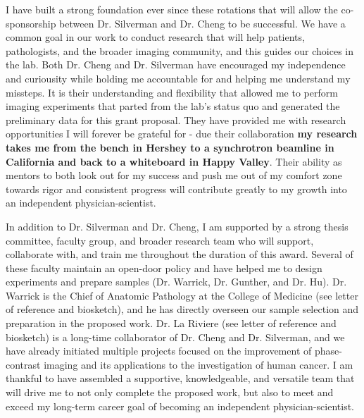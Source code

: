 \documentclass{NIHGrant}
\begin{document}
I have built a strong foundation ever since these rotations that will allow the co-sponsorship between Dr. Silverman and Dr. Cheng to be successful. We have a common goal in our work to conduct research that will help patients, pathologists, and the broader imaging community, and this guides our choices in the lab. Both Dr. Cheng and Dr. Silverman have encouraged my independence and curiousity while holding me accountable for and helping me understand my missteps. It is their understanding and flexibility that allowed me to perform imaging experiments that parted from the lab's status quo and generated the preliminary data for this grant proposal. They have provided me with research opportunities I will forever be grateful for - due their collaboration \textbf{my research takes me from the bench in Hershey to a synchrotron beamline in California and back to a whiteboard in Happy Valley}. Their ability as mentors to both look out for my success and push me out of my comfort zone towards rigor and consistent progress will contribute greatly to my growth into an independent physician-scientist.

In addition to Dr. Silverman and Dr. Cheng, I am supported by a strong thesis committee, faculty group, and broader research team who will support, collaborate with, and train me throughout the duration of this award. Several of these faculty maintain an open-door policy and have helped me to design experiments and prepare samples (Dr. Warrick, Dr. Gunther, and Dr. Hu). Dr. Warrick is the Chief of Anatomic Pathology at the College of Medicine (see letter of reference and biosketch), and he has directly overseen our sample selection and preparation in the proposed work. Dr. La Riviere (see letter of reference and biosketch) is a long-time collaborator of Dr. Cheng and Dr. Silverman, and we have already initiated multiple projects focused on the improvement of phase-contrast imaging and its applications to the investigation of human cancer. I am thankful to have assembled a supportive, knowledgeable, and versatile team that will drive me to not only complete the proposed work, but also to meet and exceed my long-term career goal of becoming an independent physician-scientist.


\end{document}
